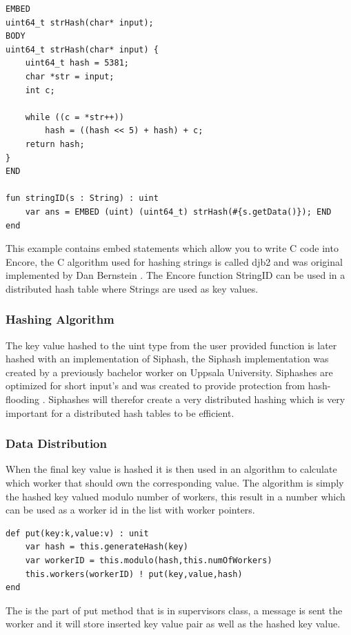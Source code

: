\begin{lstlisting}
EMBED
uint64_t strHash(char* input);
BODY
uint64_t strHash(char* input) {
    uint64_t hash = 5381;
    char *str = input;
    int c;

    while ((c = *str++))
        hash = ((hash << 5) + hash) + c;
    return hash;
}
END

fun stringID(s : String) : uint
    var ans = EMBED (uint) (uint64_t) strHash(#{s.getData()}); END
end
\end{lstlisting}
This example contains embed statements which allow you to write C code into Encore, the C algorithm used for hashing strings is called djb2 and was original implemented by Dan Bernstein \cite{string_hashing}. The Encore function StringID can be used in a distributed hash table where Strings are used as key values.

\subsubsection{Hashing Algorithm}
The key value hashed to the uint type from the user provided function is later hashed with an implementation of Siphash, the Siphash implementation was created by a previously bachelor worker \cite{lucas} on Uppsala University. Siphashes are optimized for short input's and was created to provide protection from hash-flooding \cite{siphash}. Siphashes will therefor create a very distributed hashing which is very important for a distributed hash tables to be efficient.

\subsubsection{Data Distribution}
When the final key value is hashed it is then used in an algorithm to calculate which worker that should own the corresponding value. The algorithm is simply the hashed key valued modulo number of workers, this result in a number which can be used as a worker id in the list with worker pointers.

\begin{lstlisting}
def put(key:k,value:v) : unit
    var hash = this.generateHash(key)
    var workerID = this.modulo(hash,this.numOfWorkers)
    this.workers(workerID) ! put(key,value,hash)
end
\end{lstlisting}
The is the part of put method that is in supervisors class, a message is sent the worker and it will store inserted key value pair as well as the hashed key value.

